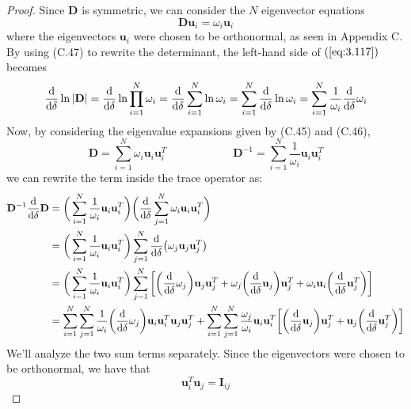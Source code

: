 \begin{proof}
    Since $\mathbf{D}$ is symmetric, we can consider the $N$ eigenvector equations
    \[
        \mathbf{D}\mathbf{u}_i = \omega_i\mathbf{u}_i
    \] 
    where the eigenvectors $\mathbf{u}_i$ were chosen to be orthonormal,
    as seen in Appendix C. By using (C.47) to rewrite the determinant,
    the left-hand side of $(\ref{eq:3.117})$ becomes
     \[
         \dv{\delta}\ln|\mathbf{D}|
         = \dv{\delta}\ln \prod_{i=1}^N \omega_i
         = \dv{\delta} \sum_{i=1}^{N} \ln \omega_i
         = \sum_{i=1}^{N} \dv{\delta} \ln \omega_i
         = \sum_{i=1}^{N} \frac{1}{\omega_i} \dv{\delta} \omega_i
    \] 
    Now, by considering the eigenvalue expansions given by (C.45) and (C.46),
    \[
        \mathbf{D} = \sum_{i=1}^{N} \omega_i \mathbf{u}_i\mathbf{u}_i^T
        \hspace{6em}
        \mathbf{D}^{-1} = \sum_{i=1}^{N} \frac{1}{\omega_i} \mathbf{u}_i\mathbf{u}_i^T
    \] 
    we can rewrite the term inside the trace operator as:
    \begin{align*}
        \mathbf{D}^{-1}\dv{\delta}\mathbf{D} 
        &= \bigg(\sum_{i=1}^{N} \frac{1}{\omega_i} \mathbf{u}_i\mathbf{u}_i^T\bigg)
        \bigg(\dv{\delta} \sum_{j=1}^{N} \omega_i\mathbf{u}_i\mathbf{u}_i^T\bigg) \\
        &= \bigg(\sum_{i=1}^{N} \frac{1}{\omega_i} \mathbf{u}_i\mathbf{u}_i^T\bigg)
        \sum_{j=1}^{N} \dv{\delta}(\omega_j\mathbf{u}_j\mathbf{u}_j^T) \\
        &= \bigg(\sum_{i=1}^{N} \frac{1}{\omega_i} \mathbf{u}_i\mathbf{u}_i^T\bigg)
        \sum_{j=1}^{N} \bigg[\bigg(\dv{\delta} \omega_j\bigg) \mathbf{u}_j\mathbf{u}_j^T 
            + \omega_j \bigg(\dv{\delta}\mathbf{u}_j\bigg) \mathbf{u}_j^T
        + \omega_i \mathbf{u}_i \bigg(\dv{\delta} \mathbf{u}_j^T\bigg)\bigg] \\
        &= \sum_{i=1}^{N} \sum_{j=1}^{N}  
            \frac{1}{\omega_i} \bigg(\dv{\delta}\omega_j\bigg) \mathbf{u}_i\mathbf{u}_i^T 
            \mathbf{u}_j\mathbf{u}_j^T 
        + \sum_{i=1}^{N} \sum_{j=1}^{N} \frac{\omega_j}{\omega_i} \mathbf{u}_i\mathbf{u}_i^T
        \bigg[\bigg(\dv{\delta} \mathbf{u}_j\bigg)\mathbf{u}_j^T 
        + \mathbf{u}_j\bigg(\dv{\delta}\mathbf{u}_j^T\bigg)\bigg]
    \end{align*}
    We'll analyze the two sum terms separately. Since the
    eigenvectors were chosen to be orthonormal, we have that
    \begin{equation*}
        \mathbf{u}_i^T\mathbf{u}_j = \mathbf{I}_{ij}

\end{equation*}
\end{proof}
